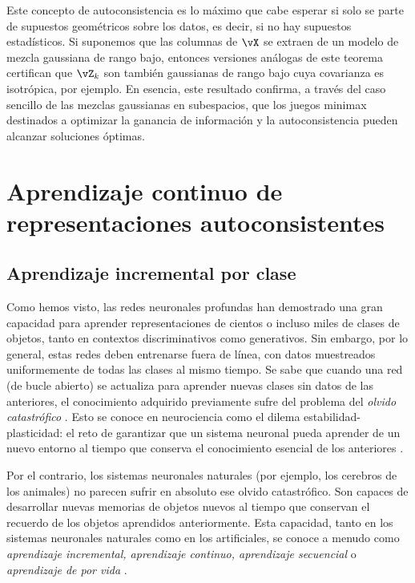 \documentclass[../../book-main_es.tex]{subfiles}
\begin{document}
Este concepto de autoconsistencia es lo máximo que cabe esperar si
solo se parte de supuestos geométricos sobre los datos, es decir, si no hay
supuestos estadísticos. Si suponemos que las columnas de \(\vX\) se
extraen de un modelo de mezcla gaussiana de rango bajo, entonces versiones análogas
de este teorema certifican que \(\vZ_{k}\) son también gaussianas de rango bajo
cuya covarianza es isotrópica, por ejemplo. %
En esencia, este resultado confirma, a través del caso sencillo de las mezclas gaussianas
en subespacios, que los juegos minimax destinados a optimizar la ganancia de información
y la autoconsistencia pueden alcanzar soluciones óptimas.

\section{Aprendizaje continuo de representaciones autoconsistentes}
\label{sec:continuous}

\subsection{Aprendizaje incremental por clase}
\label{sec:class-wise-incremental}

Como hemos visto, las redes neuronales profundas han demostrado una gran
capacidad para aprender representaciones de cientos o incluso miles de
clases de objetos, tanto en contextos discriminativos como generativos.
Sin embargo, por lo general, estas redes deben entrenarse fuera de línea, con datos
muestreados uniformemente de todas las clases al mismo tiempo. Se sabe que
cuando una red (de bucle abierto) se actualiza para aprender nuevas clases sin
datos de las anteriores, el conocimiento adquirido previamente sufre
del problema del {\em olvido catastrófico}
\cite{McCloskey1989catastrophic}. Esto se conoce en neurociencia como
el dilema estabilidad-plasticidad: el reto de garantizar que un
sistema neuronal pueda aprender de un nuevo entorno al tiempo que conserva
el conocimiento esencial de los anteriores \cite{Grossberg1987CompetitiveLF}.

Por el contrario, los sistemas neuronales naturales (por ejemplo, los cerebros de los animales) no parecen
sufrir en absoluto ese olvido catastrófico. Son capaces
de desarrollar nuevas memorias de objetos nuevos al tiempo que conservan el recuerdo de
los objetos aprendidos anteriormente. Esta capacidad, tanto en los sistemas neuronales naturales como en los
artificiales, se conoce a menudo como {\em aprendizaje incremental, aprendizaje continuo, 
aprendizaje secuencial} o {\em aprendizaje de por vida} \cite{controlled-forgetting}.
\end{document}
